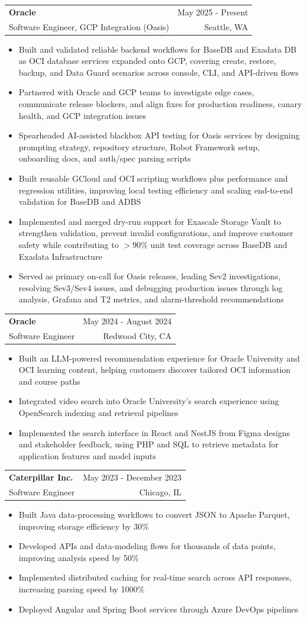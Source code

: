 \documentclass[letterpaper,11pt]{article}
\makeatletter
\newcommand{\resumeItem}[1]{
  \item\small{
    {#1 \vspace{-2pt}}
  }
}
\newcommand{\resumeSubheading}[4]{
  \vspace{-2pt}\item
    \begin{tabular*}{0.97\textwidth}[t]{l@{\extracolsep{\fill}}r}
      \textbf{#1} & #2 \\
      {\small#3} & {\small #4} \\
    \end{tabular*}\vspace{-7pt}
}
\newcommand{\resumeItemListStart}{\begin{itemize}}
\newcommand{\resumeItemListEnd}{\end{itemize}\vspace{-5pt}}
\makeatother
\begin{document}
    \resumeSubheading
  {Oracle}{May 2025 - Present}
  {Software Engineer, GCP Integration (Oasis)}{Seattle, WA}
  \resumeItemListStart
    \resumeItem{Built and validated reliable backend workflows for BaseDB and Exadata DB as OCI database services expanded onto GCP, covering create, restore, backup, and Data Guard scenarios across console, CLI, and API-driven flows}
    \resumeItem{Partnered with Oracle and GCP teams to investigate edge cases, communicate release blockers, and align fixes for production readiness, canary health, and GCP integration issues}
    \resumeItem{Spearheaded AI-assisted blackbox API testing for Oasis services by designing prompting strategy, repository structure, Robot Framework setup, onboarding docs, and auth/spec parsing scripts}
    \resumeItem{Built reusable GCloud and OCI scripting workflows plus performance and regression utilities, improving local testing efficiency and scaling end-to-end validation for BaseDB and ADBS}
    \resumeItem{Implemented and merged dry-run support for Exascale Storage Vault to strengthen validation, prevent invalid configurations, and improve customer safety while contributing to $>$90\% unit test coverage across BaseDB and Exadata Infrastructure}
    \resumeItem{Served as primary on-call for Oasis releases, leading Sev2 investigations, resolving Sev3/Sev4 issues, and debugging production issues through log analysis, Grafana and T2 metrics, and alarm-threshold recommendations}
  \resumeItemListEnd

    \resumeSubheading
      {Oracle}{May 2024 - August 2024}
      {Software Engineer}{Redwood City, CA}
      \resumeItemListStart
        \resumeItem{Built an LLM-powered recommendation experience for Oracle University and OCI learning content, helping customers discover tailored OCI information and course paths}
        \resumeItem{Integrated video search into Oracle University's search experience using OpenSearch indexing and retrieval pipelines}
        \resumeItem{Implemented the search interface in React and NestJS from Figma designs and stakeholder feedback, using PHP and SQL to retrieve metadata for application features and model inputs}
      \resumeItemListEnd

    \resumeSubheading
      {Caterpillar Inc.}{May 2023 - December 2023}
      {Software Engineer}{Chicago, IL}
      \resumeItemListStart
        \resumeItem{Built Java data-processing workflows to convert JSON to Apache Parquet, improving storage efficiency by 30\%}
        \resumeItem{Developed APIs and data-modeling flows for thousands of data points, improving analysis speed by 50\%}
        \resumeItem{Implemented distributed caching for real-time search across API responses, increasing parsing speed by 1000\%}
        \resumeItem{Deployed Angular and Spring Boot services through Azure DevOps pipelines}
      \resumeItemListEnd
\end{document}
